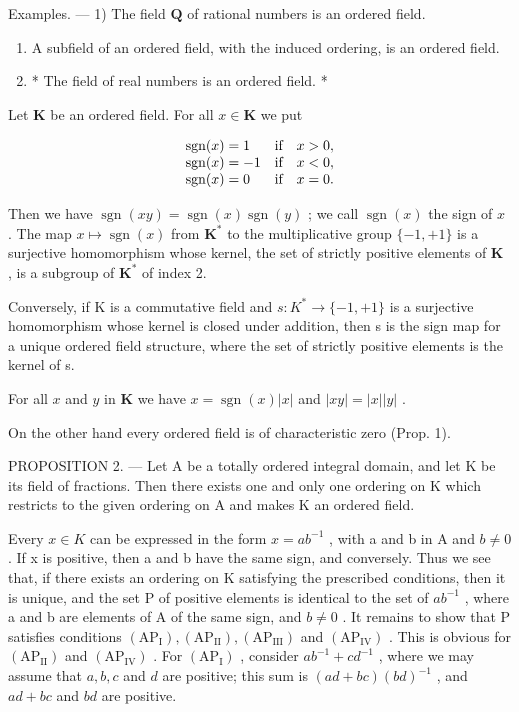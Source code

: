 Examples. --- 1) The field \(\mathbf{Q}\) of rational numbers is an ordered field.

\begin{enumerate}
\def\labelenumi{\arabic{enumi})}
\setcounter{enumi}{1}
\item
  A subfield of an ordered field, with the induced ordering, is an ordered field.
\item
  * The field of real numbers is an ordered field. *
\end{enumerate}

Let \(\mathbf{K}\) be an ordered field. For all \(x\in \mathbf{K}\) we put

\[
\begin{array}{l l} \operatorname{sgn} (x) = 1 & \text {if} \quad x > 0, \\ \operatorname{sgn} (x) = - 1 & \text {if} \quad x <   0, \\ \operatorname{sgn} (x) = 0 & \text {if} \quad x = 0. \end{array}
\]

Then we have \(\operatorname{sgn}(xy) = \operatorname{sgn}(x)\operatorname{sgn}(y)\) ; we call \(\operatorname{sgn}(x)\) the sign of \(x\) . The map \(x \mapsto \operatorname{sgn}(x)\) from \(\mathbf{K}^*\) to the multiplicative group \(\{-1, +1\}\) is a surjective homomorphism whose kernel, the set of strictly positive elements of \(\mathbf{K}\) , is a subgroup of \(\mathbf{K}^*\) of index 2.

Conversely, if K is a commutative field and \(s: K^{*} \to \{-1, +1\}\) is a surjective homomorphism whose kernel is closed under addition, then s is the sign map for a unique ordered field structure, where the set of strictly positive elements is the kernel of s.

For all \(x\) and \(y\) in \(\mathbf{K}\) we have \(x = \operatorname{sgn}(x)|x|\) and \(|xy| = |x||y|\) .

On the other hand every ordered field is of characteristic zero (Prop. 1).

PROPOSITION 2. --- Let A be a totally ordered integral domain, and let K be its field of fractions. Then there exists one and only one ordering on K which restricts to the given ordering on A and makes K an ordered field.

Every \(x \in K\) can be expressed in the form \(x = ab^{-1}\) , with a and b in A and \(b \neq 0\) . If x is positive, then a and b have the same sign, and conversely. Thus we see that, if there exists an ordering on K satisfying the prescribed conditions, then it is unique, and the set P of positive elements is identical to the set of \(ab^{-1}\) , where a and b are elements of A of the same sign, and \(b \neq 0\) . It remains to show that P satisfies conditions \((\mathrm{AP}_{\mathrm{I}}), (\mathrm{AP}_{\mathrm{II}}), (\mathrm{AP}_{\mathrm{III}})\) and \((\mathrm{AP}_{\mathrm{IV}})\) . This is obvious for \((\mathrm{AP}_{\mathrm{II}})\) and \((\mathrm{AP}_{\mathrm{IV}})\) . For \((\mathrm{AP}_{\mathrm{I}})\) , consider \(ab^{-1} + cd^{-1}\) , where we may assume that \(a, b, c\) and \(d\) are positive; this sum is \((ad + bc)(bd)^{-1}\) , and \(ad + bc\) and \(bd\) are positive.


